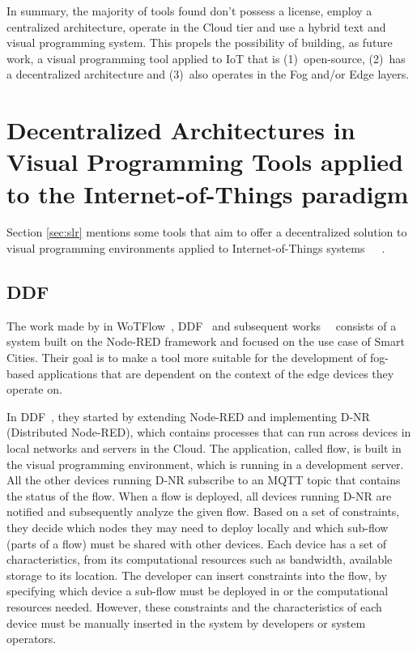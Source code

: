 In summary, the majority of tools found don't possess a license, employ a centralized architecture, operate in the Cloud tier and use a hybrid text and visual programming system. This propels the possibility of building, as future work, a visual programming tool applied to IoT that is (1)~open-source, (2)~has a decentralized architecture and (3)~also operates in the Fog and/or Edge layers.

\section{Decentralized Architectures in Visual Programming Tools applied to the Internet-of-Things paradigm}\label{sec:sota_decentralized}


Section \ref{sec:slr} mentions some tools that aim to offer a decentralized solution to visual programming environments applied to Internet-of-Things systems~\cite{ddf}~\cite{ddflow}~\cite{wotflow_dnr}.

\subsection{DDF}\label{sec:decentralized_sota_ddf}

The work made by in WoTFlow~\cite{wotflow_dnr}, DDF~\cite{ddf} and subsequent works~\cite{fog_at_the_edge}~\cite{exogenous_coordination} consists of a system built on the Node-RED framework and focused on the use case of Smart Cities. Their goal is to make a tool more suitable for the development of fog-based applications that are dependent on the context of the edge devices they operate on. 

In DDF~\cite{ddf}, they started by extending Node-RED and implementing D-NR (Distributed Node-RED), which contains processes that can run across devices in local networks and servers in the Cloud. The application, called flow, is built in the visual programming environment, which is running in a development server. All the other devices running D-NR subscribe to an MQTT topic that contains the status of the flow. When a flow is deployed, all devices running D-NR are notified and subsequently analyze the given flow. Based on a set of constraints, they decide which nodes they may need to deploy locally and which sub-flow (parts of a flow) must be shared with other devices. Each device has a set of characteristics, from its computational resources such as bandwidth, available storage to its location. The developer can insert constraints into the flow, by specifying which device a sub-flow must be deployed in or the computational resources needed. However, these constraints and the characteristics of each device must be manually inserted in the system by developers or system operators. 

